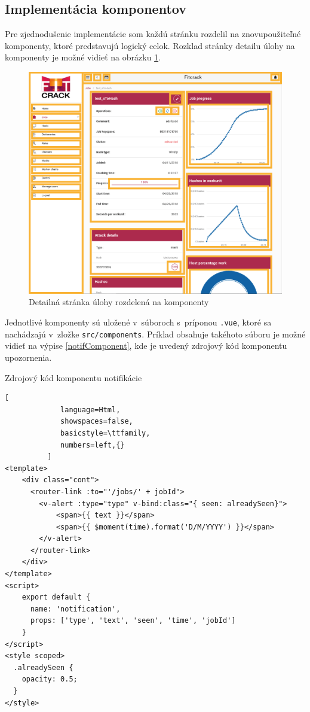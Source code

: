 \documentclass[zadani,slovak]{fitthesis}
\begin{document}
\subsection{Implementácia komponentov}
Pre zjednodušenie implementácie som každú stránku rozdelil na znovupoužiteľné komponenty, ktoré predstavujú logický celok. Rozklad stránky detailu úlohy na komponenty je možné vidieť na obrázku \ref{fig:komponenty}.
\begin{figure}[H]
    \centering
    \includegraphics[scale=0.45]{obrazky/komponenty.png}
    \caption{Detailná stránka úlohy rozdelená na komponenty}
    \label{fig:komponenty}
\end{figure}
\noindent
Jednotlivé komponenty sú uložené v~súboroch s~príponou \texttt{.vue}, ktoré sa nachádzajú v~zložke \texttt{src/components}. Príklad obsahuje takéhoto súboru je možné vidieť na výpise \ref{notifComponent}, kde je uvedený zdrojový kód komponentu upozornenia.
\begin{algorithm}[h]
  \caption{Zdrojový kód komponentu notifikácie}
  \label{notifComponent}
  \begin{lstlisting}[
             language=Html,
             showspaces=false,
             basicstyle=\ttfamily,
             numbers=left,{}
          ]
<template>
    <div class="cont">
      <router-link :to="'/jobs/' + jobId">
        <v-alert :type="type" v-bind:class="{ seen: alreadySeen}">
            <span>{{ text }}</span>
            <span>{{ $moment(time).format('D/M/YYYY') }}</span>
        </v-alert>
      </router-link>
    </div>
</template>
<script>
    export default {
      name: 'notification',
      props: ['type', 'text', 'seen', 'time', 'jobId']
    }
</script>
<style scoped>
  .alreadySeen {
    opacity: 0.5;
  }
</style>
  \end{lstlisting}
\end{algorithm}
\end{document}
